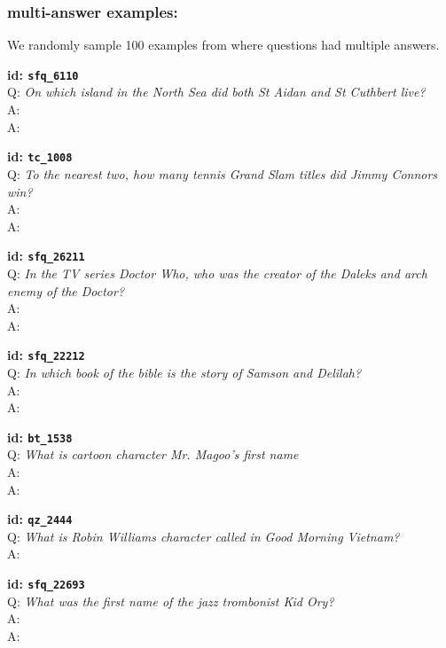 \subsubsection{\triviaqa{} multi-answer examples:}
\label{appendix:trivia-qa-examples}
\small{We randomly sample 100 examples from \triviaqa{} where questions had multiple answers.}
\\ 
\setlength{\parindent}{0cm}

\tiny{\setlength{\parindent}{0cm}
\textbf{id: \texttt{sfq\_6110}} \\
Q: \textit{On which island in the North Sea did both St Aidan and St Cuthbert live?} \\
A:  \\
A: }

\tiny{\setlength{\parindent}{0cm}
\textbf{id: \texttt{tc\_1008}} \\
Q: \textit{To the nearest two, how many tennis Grand Slam titles did Jimmy Connors win?} \\
A:  \\
A: }


\tiny{\setlength{\parindent}{0cm}
\textbf{id: \texttt{sfq\_26211}} \\
Q: \textit{In the TV series Doctor Who, who was the creator of the Daleks and arch enemy of the Doctor?} \\
A:  \\
A: }

\tiny{\setlength{\parindent}{0cm}
\textbf{id: \texttt{sfq\_22212}} \\
Q: \textit{In which book of the bible is the story of Samson and Delilah?} \\
A:  \\
A: }

\tiny{\setlength{\parindent}{0cm}
\textbf{id: \texttt{bt\_1538}} \\
Q: \textit{What is cartoon character Mr. Magoo's first name} \\
A:  \\
A: }

\tiny{\setlength{\parindent}{0cm}
\textbf{id: \texttt{qz\_2444}} \\
Q: \textit{What is Robin Williams character called in Good Morning Vietnam?} \\
A: }

\tiny{\setlength{\parindent}{0cm}
\textbf{id: \texttt{sfq\_22693}} \\
Q: \textit{What was the first name of the jazz trombonist Kid Ory?} \\
A:  \\
A: }

